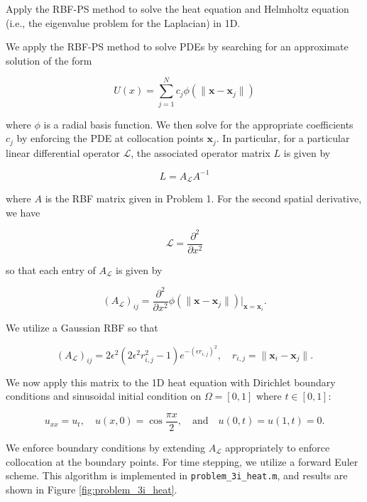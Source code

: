 Apply the RBF-PS method to solve the heat equation and Helmholtz equation (i.e., the eigenvalue problem for the 
Laplacian) in 1D.

\begin{solution}
    We apply the RBF-PS method to solve PDEs by searching for an approximate solution of the form

    \begin{equation}\label{eq:rbf-approximation}
        U(x) = \sum\limits_{j=1}^N c_j \phi(\lVert \bm{x} - \bm{x}_j \rVert)
    \end{equation}

    where $\phi$ is a radial basis function. We then solve for the appropriate coefficients $c_j$ by enforcing the PDE 
    at collocation points $\bm{x}_j$. In particular, for a particular linear differential operator $\mathcal{L}$,
    the associated operator matrix $L$ is given by

    $$
    L = A_{\mathcal{L}} A^{-1}
    $$

    where $A$ is the RBF matrix given in Problem 1. For the second spatial derivative, we have

    $$
    \mathcal{L} = \frac{\partial^2}{\partial x^2}
    $$

    so that each entry of $A_{\mathcal{L}}$ is given by

    $$
    (A_{\mathcal{L}})_{ij} = \frac{\partial^2}{\partial x^2} \phi(\lVert \bm{x} - \bm{x}_j \rVert)\bigg|_{\bm{x} = \bm{x}_i}.
    $$

    We utilize a Gaussian RBF so that

    $$
    (A_{\mathcal{L}})_{ij} = 2 \epsilon^2 \left(2 \epsilon^2 r_{i,j}^2 - 1 \right) e^{-(\epsilon r_{i,j})^2}, \quad r_{i,j} = \lVert \bm{x}_i - \bm{x}_j \rVert.
    $$

    We now apply this matrix to the 1D heat equation with Dirichlet boundary conditions and sinusoidal initial 
    condition on $\Omega = [0, 1]$ where $t \in [0, 1]$: 
    
    $$
    u_{xx} = u_t,  \quad u(x, 0) = \cos{\frac{\pi x}{2}}, \quad \text{and} \quad u(0, t) = u(1, t) = 0. 
    $$

    We enforce boundary conditions by extending $A_{\mathcal{L}}$ appropriately to enforce collocation at the boundary 
    points. For time stepping, we utilize a forward Euler scheme. This algorithm is implemented in 
    \texttt{problem\_3i\_heat.m}, and results are shown in Figure \ref{fig:problem_3i_heat}.
    

\end{solution}
